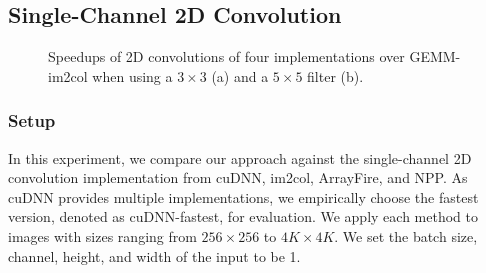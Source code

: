 \subsection{Single-Channel 2D Convolution\label{sec:ex2dc}}
\begin{figure}
\centering
{}
\hspace{0em}

\vspace{-1mm}	\caption{Speedups of 2D convolutions of four implementations over GEMM-im2col when using a $3 \times 3$ (a) and a $5 \times
5$ filter (b).} \label{fig:2druntime} \vspace{-3mm}
\end{figure}


\subsubsection{Setup}
In this experiment, we compare our approach against the single-channel 2D convolution implementation from cuDNN, im2col, ArrayFire, and
NPP. As cuDNN provides multiple implementations, we empirically choose the fastest version, denoted as cuDNN-fastest, for evaluation. We
apply each method to images with sizes ranging from $256 \times 256$ to $4K \times 4K$. We set the batch size, channel, height, and width
of the input to be 1.


